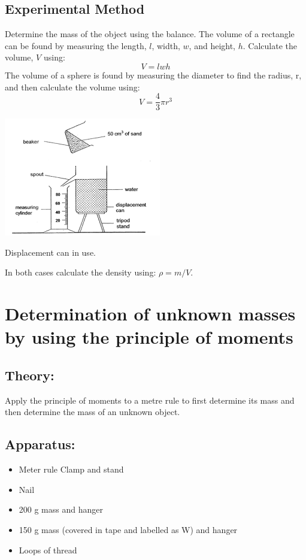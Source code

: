 \documentclass{tufte-handout}
\begin{document}
\subsection{Experimental Method}
Determine the mass of the object using the balance. 
The volume of a rectangle can be found by measuring the length, $l$, width, $w$, and height, $h$. Calculate the volume, $V$ using:
\[V = l  w  h\]
The volume of a sphere is found by measuring the diameter to find the radius, r, and then calculate the volume using: \[ V= \frac{4}{3} \pi r^{3}\] 
\begin{marginfigure}
\includegraphics{eurekacan.png}
\caption{Displacement can in use.}
\end{marginfigure} 
In both cases calculate the density using: $ \rho = m/V$.
\section{Determination of unknown masses by using the principle of moments}
\subsection{Theory:}  
Apply the principle of moments to a metre rule to first determine its mass and then determine the mass of an unknown object.   
\subsection{Apparatus:} 
\begin{itemize}
\item Meter rule Clamp and stand 
\item Nail 
\item 200 g mass and hanger 
\item 150 g mass (covered in tape and labelled as W) and hanger 
\item Loops of thread           
\end{itemize}
\end{document}
